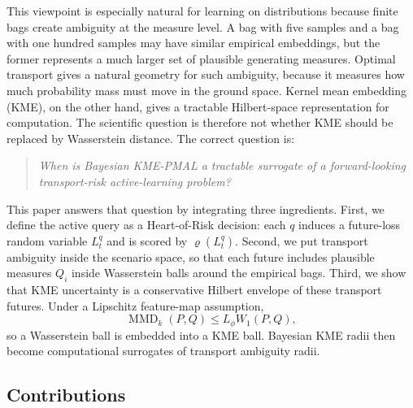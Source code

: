 \documentclass[10pt,journal]{IEEEtran}
\DeclareMathOperator{\MMD}{MMD}
\newcommand{\risk}{\varrho}
\begin{document}
This viewpoint is especially natural for learning on distributions because finite bags create ambiguity at the measure level. A bag with five samples and a bag with one hundred samples may have similar empirical embeddings, but the former represents a much larger set of plausible generating measures. Optimal transport gives a natural geometry for such ambiguity, because it measures how much probability mass must move in the ground space. Kernel mean embedding (KME), on the other hand, gives a tractable Hilbert-space representation for computation. The scientific question is therefore not whether KME should be replaced by Wasserstein distance. The correct question is:
\begin{quote}
\emph{When is Bayesian KME-PMAL a tractable surrogate of a forward-looking transport-risk active-learning problem?}
\end{quote}

This paper answers that question by integrating three ingredients. First, we define the active query as a Heart-of-Risk decision: each $q$ induces a future-loss random variable $L_t^q$ and is scored by $\risk(L_t^q)$. Second, we put transport ambiguity inside the scenario space, so that each future includes plausible measures $Q_i$ inside Wasserstein balls around the empirical bags. Third, we show that KME uncertainty is a conservative Hilbert envelope of these transport futures. Under a Lipschitz feature-map assumption,
\begin{equation}
    \MMD_k(P,Q)\le L_\phi W_1(P,Q),
\end{equation}
so a Wasserstein ball is embedded into a KME ball. Bayesian KME radii then become computational surrogates of transport ambiguity radii.

\subsection{Contributions}
\end{document}
